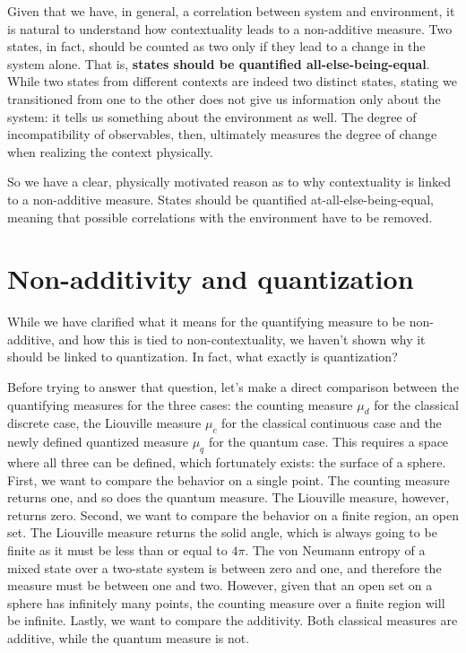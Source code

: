 \documentclass[10pt,twocolumn, nofootinbib]{revtex4-2}
\begin{document}
Given that we have, in general, a correlation between system and environment, it is natural to understand how contextuality leads to a non-additive measure. Two states, in fact, should be counted as two only if they lead to a change in the system alone. That is, \textbf{states should be quantified all-else-being-equal}. While two states from different contexts are indeed two distinct states, stating we transitioned from one to the other does not give us information only about the system: it tells us something about the environment as well. The degree of incompatibility of observables, then, ultimately measures the degree of change when realizing the context physically.

So we have a clear, physically motivated reason as to why contextuality is linked to a non-additive measure. States should be quantified at-all-else-being-equal, meaning that possible correlations with the environment have to be removed.

\section{Non-additivity and quantization}

While we have clarified what it means for the quantifying measure to be non-additive, and how this is tied to non-contextuality, we haven't shown why it should be linked to quantization. In fact, what exactly is quantization?

Before trying to answer that question, let's make a direct comparison between the quantifying measures for the three cases: the counting measure $\mu_d$ for the classical discrete case, the Liouville measure $\mu_c$ for the classical continuous case and the newly defined quantized measure $\mu_q$ for the quantum case. This requires a space where all three can be defined, which fortunately exists: the surface of a sphere. First, we want to compare the behavior on a single point. The counting measure returns one, and so does the quantum measure. The Liouville measure, however, returns zero. Second, we want to compare the behavior on a finite region, an open set. The Liouville measure returns the solid angle, which is always going to be finite as it must be less than or equal to $4\pi$. The von Neumann entropy of a mixed state over a two-state system is between zero and one, and therefore the measure must be between one and two. However, given that an open set on a sphere has infinitely many points, the counting measure over a finite region will be infinite. Lastly, we want to compare the additivity. Both classical measures are additive, while the quantum measure is not.
\end{document}

